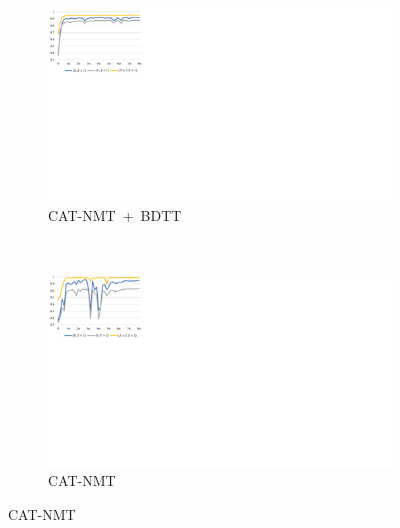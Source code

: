 
\begin{figure}[!htbp]
    \centering
    \begin{subfigure}[b]{0.5\textwidth}
      \includegraphics[width=\textwidth]{Img/fig_5_training_cat_mmt_bi.pdf}
      \caption{CAT-NMT~+~BDTT}
      \label{fig:5_training_cat_mmt_bi}
    \end{subfigure}%
    ~%
    \begin{subfigure}[b]{0.5\textwidth}
      \includegraphics[width=\textwidth]{Img/fig_5_training_cat_mmt.pdf}
      \caption{CAT-NMT}
      \label{fig:5_training_cat_mmt}
    \end{subfigure}
    \label{fig:5_training}
\end{figure}